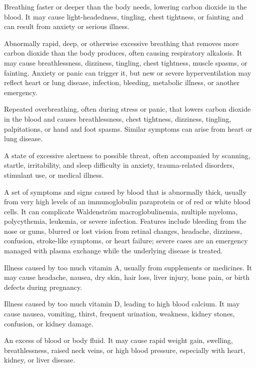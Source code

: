  Breathing faster or deeper than the body needs, lowering carbon dioxide in the blood. It may cause light-headedness, tingling, chest tightness, or fainting and can result from anxiety or serious illness.

 Abnormally rapid, deep, or otherwise excessive breathing that removes more carbon dioxide than the body produces, often causing respiratory alkalosis. It may cause breathlessness, dizziness, tingling, chest tightness, muscle spasms, or fainting. Anxiety or panic can trigger it, but new or severe hyperventilation may reflect heart or lung disease, infection, bleeding, metabolic illness, or another emergency.

 Repeated overbreathing, often during stress or panic, that lowers carbon dioxide in the blood and causes breathlessness, chest tightness, dizziness, tingling, palpitations, or hand and foot spasms. Similar symptoms can arise from heart or lung disease.

 A state of excessive alertness to possible threat, often accompanied by scanning, startle, irritability, and sleep difficulty in anxiety, trauma-related disorders, stimulant use, or medical illness.

 A set of symptoms and signs caused by blood that is abnormally thick, usually from very high levels of an immunoglobulin paraprotein or of red or white blood cells. It can complicate Waldenström macroglobulinemia, multiple myeloma, polycythemia, leukemia, or severe infection. Features include bleeding from the nose or gums, blurred or lost vision from retinal changes, headache, dizziness, confusion, stroke-like symptoms, or heart failure; severe cases are an emergency managed with plasma exchange while the underlying disease is treated.

 Illness caused by too much vitamin A, usually from supplements or medicines. It may cause headache, nausea, dry skin, hair loss, liver injury, bone pain, or birth defects during pregnancy.

 Illness caused by too much vitamin D, leading to high blood calcium. It may cause nausea, vomiting, thirst, frequent urination, weakness, kidney stones, confusion, or kidney damage.

 An excess of blood or body fluid. It may cause rapid weight gain, swelling, breathlessness, raised neck veins, or high blood pressure, especially with heart, kidney, or liver disease.

